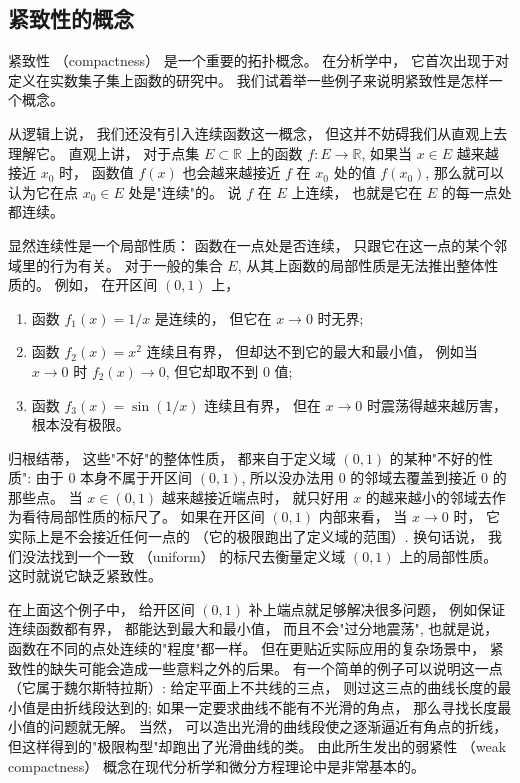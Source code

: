 


\subsection{紧致性的概念}
紧致性 （compactness） 是一个重要的拓扑概念。 在分析学中， 它首次出现于对定义在实数集子集上函数的研究中。 我们试着举一些例子来说明紧致性是怎样一个概念。

从逻辑上说， 我们还没有引入连续函数这一概念， 但这并不妨碍我们从直观上去理解它。 直观上讲， 对于点集 $E\subset\mathbb{R}$ 上的函数 $f:E\to\mathbb{R}$, 如果当 $x\in E$ 越来越接近 $x_0$ 时， 函数值 $f(x)$ 也会越来越接近 $f$ 在 $x_0$ 处的值 $f(x_0)$, 那么就可以认为它在点 $x_0\in E$ 处是"连续"的。 说 $f$ 在 $E$ 上连续， 也就是它在 $E$ 的每一点处都连续。 

显然连续性是一个局部性质： 函数在一点处是否连续， 只跟它在这一点的某个邻域里的行为有关。 对于一般的集合 $E$, 从其上函数的局部性质是无法推出整体性质的。 例如， 在开区间 $(0,1)$ 上，

\begin{enumerate}
\item 函数 $f_1(x)=1/x$ 是连续的， 但它在 $x\to0$ 时无界; 
\item 函数 $f_2(x)=x^2$ 连续且有界， 但却达不到它的最大和最小值， 例如当 $x\to0$ 时 $f_2(x)\to0$, 但它却取不到 $0$ 值; 
\item 函数 $f_3(x)=\sin(1/x)$ 连续且有界， 但在 $x\to0$ 时震荡得越来越厉害， 根本没有极限。 
\end{enumerate}

归根结蒂， 这些"不好"的整体性质， 都来自于定义域 $(0,1)$ 的某种"不好的性质": 由于 $0$ 本身不属于开区间 $(0,1)$, 所以没办法用 $0$ 的邻域去覆盖到接近 $0$ 的那些点。 当 $x\in(0,1)$ 越来越接近端点时， 就只好用 $x$ 的越来越小的邻域去作为看待局部性质的标尺了。 如果在开区间 $(0,1)$ 内部来看， 当 $x\to0$ 时， 它实际上是不会接近任何一点的 （它的极限跑出了定义域的范围）. 换句话说， 我们没法找到一个一致 （uniform） 的标尺去衡量定义域 $(0,1)$ 上的局部性质。 这时就说它缺乏紧致性。 

在上面这个例子中， 给开区间 $(0,1)$ 补上端点就足够解决很多问题， 例如保证连续函数都有界， 都能达到最大和最小值， 而且不会"过分地震荡", 也就是说， 函数在不同的点处连续的"程度"都一样。 但在更贴近实际应用的复杂场景中， 紧致性的缺失可能会造成一些意料之外的后果。 有一个简单的例子可以说明这一点 （它属于魏尔斯特拉斯）: 给定平面上不共线的三点， 则过这三点的曲线长度的最小值是由折线段达到的; 如果一定要求曲线不能有不光滑的角点， 那么寻找长度最小值的问题就无解。 当然， 可以造出光滑的曲线段使之逐渐逼近有角点的折线， 但这样得到的"极限构型"却跑出了光滑曲线的类。 由此所生发出的弱紧性 （weak compactness） 概念在现代分析学和微分方程理论中是非常基本的。

